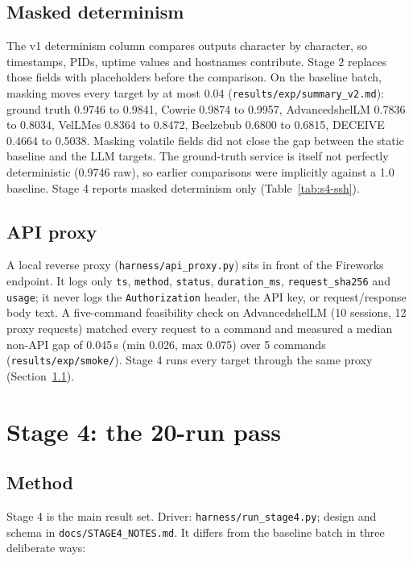 \documentclass[a4paper,11pt]{article}
\begin{document}
\subsection{Masked determinism}

The v1 determinism column compares outputs character by character, so
timestamps, PIDs, uptime values and hostnames contribute. Stage 2 replaces
those fields with placeholders before the comparison. On the baseline batch,
masking moves every target by at most 0.04
(\texttt{results/exp/summary\_v2.md}): ground truth 0.9746 to 0.9841, Cowrie
0.9874 to 0.9957, AdvancedshelLM 0.7836 to 0.8034, VelLMes 0.8364 to 0.8472,
Beelzebub 0.6800 to 0.6815, DECEIVE 0.4664 to 0.5038. Masking volatile fields
did not close the gap between the static baseline and the LLM targets. The
ground-truth service is itself not perfectly deterministic (0.9746 raw), so
earlier comparisons were implicitly against a 1.0 baseline. Stage 4 reports
masked determinism only (Table~\ref{tab:s4-ssh}).

\subsection{API proxy}

A local reverse proxy (\texttt{harness/api\_proxy.py}) sits in front of the
Fireworks endpoint. It logs only \texttt{ts}, \texttt{method},
\texttt{status}, \texttt{duration\_ms}, \texttt{request\_sha256} and
\texttt{usage}; it never logs the \texttt{Authorization} header, the API key,
or request/response body text. A five-command feasibility check on
AdvancedshelLM (10 sessions, 12 proxy requests) matched every request to a
command and measured a median non-API gap of 0.045\,s (min 0.026, max 0.075)
over 5 commands (\texttt{results/exp/smoke/}). Stage 4 runs every target through
the same proxy (Section~\ref{sec:s4-method}).

\section{Stage 4: the 20-run pass}
\label{sec:s4}

\subsection{Method}
\label{sec:s4-method}

Stage 4 is the main result set. Driver: \texttt{harness/run\_stage4.py};
design and schema in \texttt{docs/STAGE4\_NOTES.md}. It differs from the
baseline batch in three deliberate ways:
\end{document}
